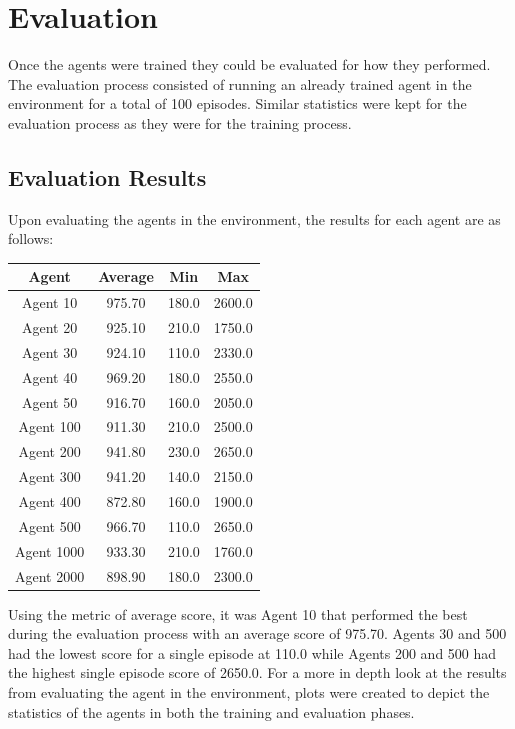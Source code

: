 \documentclass[
	a4paper, %
	10pt, %
	unnumberedsections, %
	twoside, %
]{LTJournalArticle}
\begin{document}
\section{Evaluation}

Once the agents were trained they could be evaluated for how they performed. The evaluation process consisted of running an already trained agent in the environment for a total of 100 episodes. Similar statistics
were kept for the evaluation process as they were for the training process.

\subsection{Evaluation Results}

Upon evaluating the agents in the environment, the results for each agent are as follows:

\begin{center}
	\begin{tabular}[ht]{|c|c|c|c|}
		\hline \textbf{Agent} & \textbf{Average} & \textbf{Min} & \textbf{Max} \\ \hline
		Agent 10 & 975.70 & 180.0 & 2600.0 \\ \hline
		Agent 20 & 925.10 & 210.0 & 1750.0 \\ \hline
		Agent 30 & 924.10 & 110.0 & 2330.0 \\ \hline
		Agent 40 & 969.20 & 180.0 & 2550.0 \\ \hline
		Agent 50 & 916.70 & 160.0 & 2050.0 \\ \hline
		Agent 100 & 911.30 & 210.0 & 2500.0 \\ \hline
		Agent 200 & 941.80 & 230.0 & 2650.0 \\ \hline
		Agent 300 & 941.20 & 140.0 & 2150.0 \\ \hline
		Agent 400 & 872.80 & 160.0 & 1900.0 \\ \hline
		Agent 500 & 966.70 & 110.0 & 2650.0 \\ \hline
		Agent 1000 & 933.30 & 210.0 & 1760.0 \\ \hline
		Agent 2000 & 898.90 & 180.0 & 2300.0 \\ \hline
	\end{tabular}
\end{center}

Using the metric of average score, it was Agent 10 that performed the best during the evaluation process with an average score of 975.70. Agents 30 and 500 had the lowest score for a single episode at 
110.0 while Agents 200 and 500 had the highest single episode score of 2650.0. For a more in depth look at the results from evaluating the agent in the environment, plots were created to depict the statistics
of the agents in both the training and evaluation phases.
\end{document}
